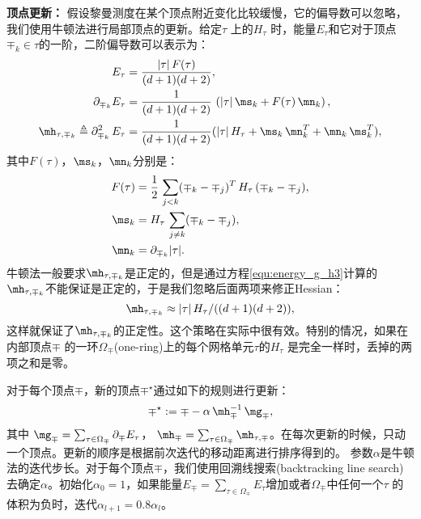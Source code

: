 \textbf{顶点更新：} 假设黎曼测度在某个顶点附近变化比较缓慢，它的偏导数可以忽略，我们使用牛顿法进行局部顶点的更新。给定$\tau$ 上的$H_\tau$ 时，能量$E_{\tau}$和它对于顶点$\mp_k \in \tau$的一阶，二阶偏导数可以表示为：
\begin{align}
	E_\tau                  & =  \frac{|\tau| \, F(\tau)}{(d+1)(d+2)},  \label{equ:energy_g_h1}\\
	\partial_{\mp_k} E_\tau & =  \frac{1}{(d+1)(d+2)} \, \left( |\tau| \, \ms_k  + F(\tau) \,  \mn_k \right),  \label{equ:energy_g_h2}\\
	\mh_{\tau,\mp_k} \triangleq \partial^2_{\mp_k} \, E_\tau &= \frac{1}{(d+1)(d+2)} ( |\tau| \, H_\tau + \ms_k  \,  \mn_k^T +  \mn_k \, \ms_k^T),  \label{equ:energy_g_h3}
\end{align}
其中$F(\tau)$，$\ms_k$，$\mn_k$分别是：
\begin{align}
F(\tau) &= \frac{1}{2} \, \sum_{j<k}(\mp_k-\mp_j)^T \, H_\tau \, (\mp_k-\mp_j),\\
\ms_k &=  H_\tau \, \sum_{j \neq k} (\mp_k-\mp_j),\\
\mn_k &= \partial_{\mp_k} |\tau|.
\end{align}
牛顿法一般要求$\mh_{\tau,\mp_k}$是正定的，但是通过方程\ref{equ:energy_g_h3}计算的$\mh_{\tau,\mp_k}$不能保证是正定的，于是我们忽略后面两项来修正Hessian：
\begin{equation}
\mh_{\tau,\mp_k} \approx  |\tau| \, H_\tau / ((d+1)(d+2)),
\end{equation}
这样就保证了$\mh_{\tau,\mp_k}$的正定性。这个策略在实际中很有效。特别的情况，如果在内部顶点$\mp$ 的一环$\Omega_\mp$(one-ring)上的每个网格单元$\tau$的$H_\tau$ 是完全一样时，丢掉的两项之和是零。

对于每个顶点$\mp$，新的顶点$\mp^\star$通过如下的规则进行更新：
\begin{equation} \label{eqn:iter}
	\mp^\star := \mp - \alpha \, \mh_{\mp}^{-1} \, \mg_\mp,
\end{equation}
其中 $\mg_\mp = \sum _{\tau \in \Omega_\mp} \partial_{\mp} E_\tau $， $\mh_\mp = \sum_{\tau \in \Omega_\mp} \mh_{\tau, \mp}$。在每次更新的时候，只动一个顶点。更新的顺序是根据前次迭代的移动距离进行排序得到的。
参数$\alpha$是牛顿法的迭代步长。对于每个顶点$\mp$，我们使用回溯线搜索(backtracking line search)去确定$\alpha$。初始化$\alpha_0=1$，如果能量$E_\mp = \sum _{\tau \in \Omega_\mp} E_\tau$增加或者$\Omega_\mp$中任何一个$\tau$ 的体积为负时，迭代$\alpha_{l+1}=0.8\alpha_l$。

